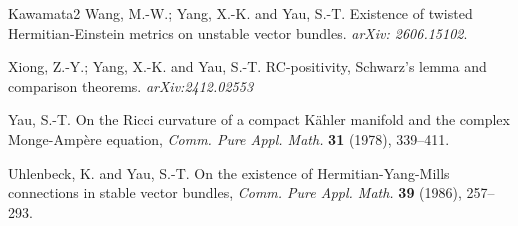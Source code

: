 \documentclass[12pt, reqno]{amsart}
\theoremstyle{plain}
\theoremstyle{definition}
\renewcommand{\>}{\rightarrow}
\renewcommand{\>}{\rightarrow}
\numberwithin{equation}{section} %
\begin{document}
\begin{thebibliography}{Kawamata2}
  Wang, M.-W.; Yang, X.-K. and Yau, S.-T. Existence of twisted Hermitian-Einstein metrics on unstable vector bundles. \emph{arXiv: 2606.15102}.

     Xiong, Z.-Y.; Yang, X.-K. and  Yau, S.-T.
    RC-positivity, Schwarz's lemma and comparison theorems. \emph{arXiv:2412.02553}






    Yau, S.-T.  On the Ricci curvature of a compact K\"ahler manifold and the complex Monge-Amp\`ere equation, \emph{Comm. Pure Appl. Math.} \textbf{31} (1978), 339--411.



    Uhlenbeck, K. and Yau, S.-T.  On the existence of Hermitian-Yang-Mills connections in stable vector bundles, \emph{Comm. Pure Appl. Math.} \textbf{39} (1986), 257--293.





    \end{thebibliography}
\end{document}
